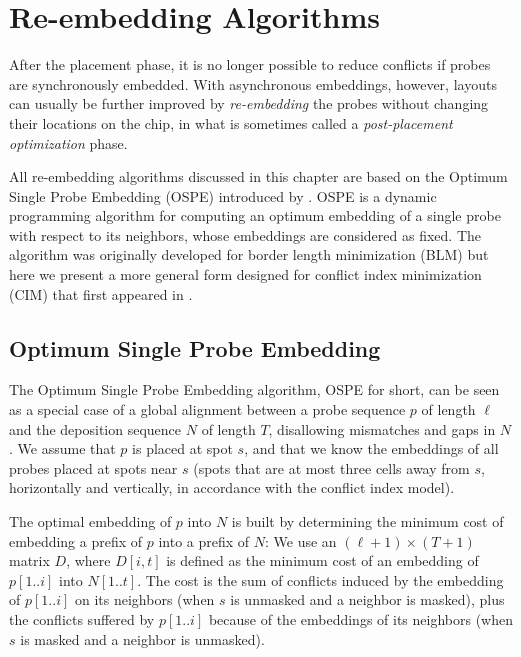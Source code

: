 \chapter{Re-embedding Algorithms}
\label{ch:reembed}

After the placement phase, it is no longer possible to reduce conflicts if
probes are synchronously embedded. With asynchronous embeddings, however,
layouts can usually be further improved by \emph{re-embedding} the probes
without changing their locations on the chip, in what is sometimes called a
\emph{post-placement optimization} phase.

All re-embedding algorithms discussed in this chapter are based on the Optimum
Single Probe Embedding (OSPE) introduced by \citet{Kahng2002}. OSPE is a dynamic
programming algorithm for computing an optimum embedding of a single probe with
respect to its neighbors, whose embeddings are considered as fixed. The
algorithm was originally developed for border length minimization (BLM) but here
we present a more general form designed for conflict index minimization (CIM)
that first appeared in \citep{Carvalho2006}.

\section{Optimum Single Probe Embedding}
\label{sec:reembed_ospe}

The Optimum Single Probe Embedding algorithm, OSPE for short, can be seen as a
special case of a global alignment between a probe sequence $p$ of length $\ell$
and the deposition sequence $N$ of length $T$, disallowing mismatches and gaps
in $N$. We assume that $p$ is placed at spot $s$, and that we know the
embeddings of all probes placed at spots near $s$ (spots that are at most three
cells away from $s$, horizontally and vertically, in accordance with the
conflict index model).

The optimal embedding of $p$ into $N$ is built by determining the minimum cost
of embedding a prefix of $p$ into a prefix of $N$: We use an
$(\ell + 1) \times (T + 1)$ matrix $D$, where $D[i,t]$ is defined as the minimum
cost of an embedding of $p[1..i]$ into $N[1..t]$. The cost is the sum of
conflicts induced by the embedding of $p[1..i]$ on its neighbors (when $s$ is
unmasked and a neighbor is masked), plus the conflicts suffered by $p[1..i]$
because of the embeddings of its neighbors (when $s$ is masked and a neighbor is
unmasked).

